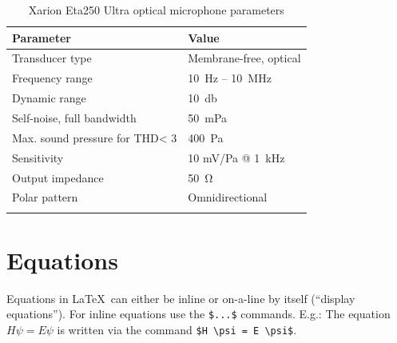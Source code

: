 \documentclass[sn-nature]{sn-jnl}%
\theoremstyle{thmstyleone}%
\theoremstyle{thmstyletwo}%
\theoremstyle{thmstylethree}%
\begin{document}
    \begin{table}[h!]
    \caption{Xarion Eta250 Ultra optical microphone parameters \cite{xarion_eta}}\label{tab:xarionparameters}%
    \begin{tabular}{@{}ll@{}}
    \toprule    
    Parameter & Value  \\
    \midrule

    Transducer type & Membrane-free, optical  \\
    Frequency range &  \SI{10}{\hertz} -- \SI{10}{\mega\hertz} \\
    Dynamic range & \SI{10}{\decibel}  \\
    Self-noise, full bandwidth & \SI{50}{\milli\pascal}  \\ 
    Max. sound pressure for THD\footnotemark[1]  < 3 & \SI{400}{\pascal}  \\
    Sensitivity & 10 mV/Pa @ \SI{1}{\kilo\hertz}  \\
    Output impedance & \SI{50}{\ohm}   \\
    Polar pattern & Omnidirectional  \\
    \botrule
    \end{tabular}
    \end{table}





\section{Equations}\label{sec4}

Equations in \LaTeX\ can either be inline or on-a-line by itself (``display equations''). For
inline equations use the \verb+$...$+ commands. E.g.: The equation
$H\psi = E \psi$ is written via the command \verb+$H \psi = E \psi$+.
\end{document}
